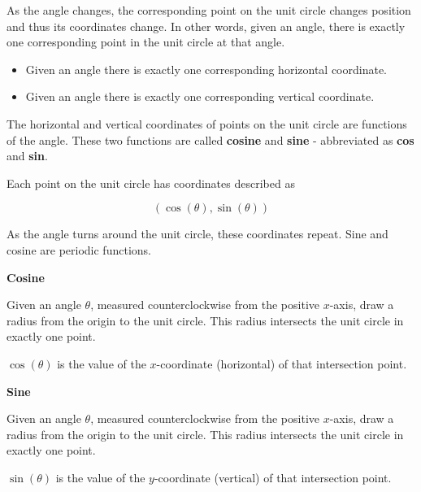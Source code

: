\documentclass{ximera}
\begin{document}
\begin{example}
As the angle changes, the corresponding point on the unit circle changes position and thus its coordinates change.  In other words, given an angle, there is exactly one corresponding point in the unit circle at that angle.  

\begin{itemize}
\item Given an angle there is exactly one corresponding horizontal coordinate.
\item Given an angle there is exactly one corresponding vertical coordinate. 
\end{itemize}


The horizontal and vertical coordinates of points on the unit circle are functions of the angle.  These two functions are called \textbf{cosine} and \textbf{sine} - abbreviated as \textbf{cos} and \textbf{sin}.

Each point on the unit circle has coordinates described as 

\[  (\cos(\theta), \sin(\theta))  \] 

As the angle turns around the unit circle, these coordinates repeat. Sine and cosine are periodic functions.

\end{example}







\begin{definition} \textbf{\textcolor{green!50!black}{Cosine}}


Given an angle $\theta$, measured counterclockwise from the positive $x$-axis, draw a radius from the origin to the unit circle.  This radius intersects the unit circle in exactly one point.


$\cos(\theta)$ is the value of the $x$-coordinate (horizontal) of that intersection point.


\end{definition}









\begin{definition} \textbf{\textcolor{green!50!black}{Sine}}


Given an angle $\theta$, measured counterclockwise from the positive $x$-axis, draw a radius from the origin to the unit circle.  This radius intersects the unit circle in exactly one point.


$\sin(\theta)$ is the value of the $y$-coordinate (vertical) of that intersection point.


\end{definition}
\end{document}
